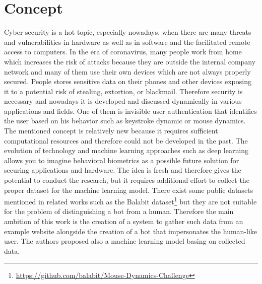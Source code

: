 \section{Concept}\label{sec:concept}
Cyber security is a hot topic, especially nowadays, when there are many threats and vulnerabilities in hardware as well as in software and the facilitated remote access to computers.
In the era of coronavirus, many people work from home which increases the risk of attacks because they are outside the internal company network and many of them use their own devices which are not always properly secured.
People stores sensitive data on their phones and other devices exposing it to a potential risk of stealing, extortion, or blackmail.
Therefore security is necessary and nowadays it is developed and discussed dynamically in various applications and fields.
One of them is invisible user authentication that identifies the user based on his behavior such as keystroke dynamic or mouse dynamics.
The mentioned concept is relatively new because it requires sufficient computational resources and therefore could not be developed in the past.
The evolution of technology and machine learning approaches such as deep learning allows you to imagine behavioral biometrics as a possible future solution for securing applications and hardware.
The idea is fresh and therefore gives the potential to conduct the research, but it requires additional effort to collect the proper dataset for the machine learning model.
There exist some public datasets mentioned in related works such as the Balabit dataset\footnote{\url{https://github.com/balabit/Mouse-Dynamics-Challenge}} but they are not suitable for the problem of distinguishing a bot from a human.
Therefore the main ambition of this work is the creation of a system to gather such data from an example website alongside the creation of a bot that impersonates the human-like user.
The authors proposed also a machine learning model basing on collected data.
